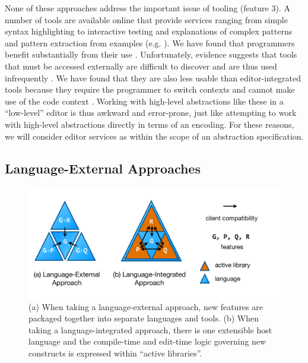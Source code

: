 None of these approaches address the important issue of tooling (feature 3). A number of tools are available online that provide services ranging from simple syntax highlighting to interactive testing and explanations of complex patterns \cite{regexr} and pattern extraction from examples (e.g. \cite{_txt2re:_????}). We have found that programmers benefit substantially from their use \cite{Omar:2012:ACC:2337223.2337324}. Unfortunately, evidence suggests that tools that must be accessed externally are difficult to discover and are thus used infrequently \cite{Murphy-Hill:2011:PIE:1958824.1958888,Campbell:2008:DRT:1636642.1636651,Omar:2012:ACC:2337223.2337324}. We have found that they are also less usable than editor-integrated tools %
because they require the programmer to switch contexts and cannot make use of the code context \cite{Omar:2012:ACC:2337223.2337324}. Working with high-level abstractions like these in a ``low-level'' editor is thus awkward and error-prone, just like attempting to work with high-level abstractions directly in terms of an encoding. For these reasons,   we will consider editor services as within the scope of an abstraction specification.
\subsection{Language-External Approaches}\label{external-approaches}
\begin{figure}
\begin{center}
\includegraphics[scale=.48]{approaches.pdf}
\end{center}
\vspace{-20px}
\caption{\small (a) When taking a language-external approach, new features are packaged together into separate languages and tools. (b) When taking a language-integrated approach, there is one extensible host language and the compile-time and edit-time logic governing new constructs is expressed within ``active libraries''.}
\label{approaches}
\end{figure}

